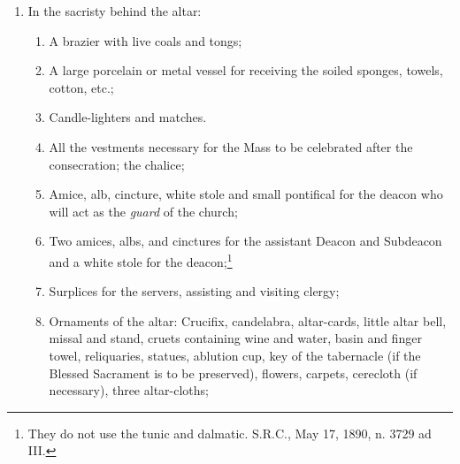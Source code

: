 \documentclass[letterpaper]{report}
\newcommand\src{\textsc{S.R.C.}}
\begin{document}
{\begin{enumerate}[label=\Roman*.]
        \item In the sacristy behind the altar:

            \begin{enumerate}[label=\arabic*.]

                \item A brazier with live coals and tongs;

                \item A large porcelain or metal vessel for receiving the
                    soiled sponges, towels, cotton, etc.;

                \item Candle-lighters and matches.




                \item All the vestments necessary for the Mass to be celebrated
                    after the consecration; the chalice;

                \item Amice, alb, cincture, white stole and small pontifical
                    for the deacon who will act as the \textit{guard} of the
                    church;

                \item Two amices, albs, and cinctures for the assistant Deacon
                    and Subdeacon and a white stole for the
                    deacon;\footnote{They do not use the tunic and dalmatic.
                    \src, May 17, 1890, n. 3729 ad III.}

                \item Surplices for the servers, assisting and visiting clergy;

                \item Ornaments of the altar: Crucifix, candelabra,
                    altar-cards, little altar bell, missal and stand, cruets
                    containing wine and water, basin and finger towel,
                    reliquaries, statues, ablution cup, key of the tabernacle
                    (if the Blessed Sacrament is to be preserved), flowers,
                    carpets, cerecloth (if necessary), three altar-cloths;


\end{enumerate}
\end{enumerate}}
\end{document}
